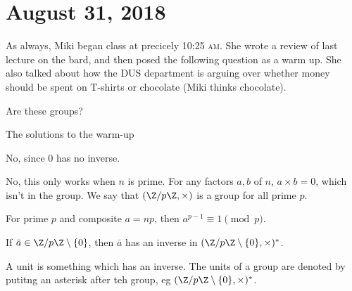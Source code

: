 \section{August 31, 2018}

As always, Miki began class at precicely 10:25 \textsc{am}. She wrote a review of last lecture on the bard, and then posed the following question as a warm up. She also talked about how the DUS department is arguing over whether money should be spent on T-shirts or chocolate (Miki thinks chocolate).

\begin{problem}[Warm Up]
Are these groups?
\end{problem}

\begin{solution}
The solutions to the warm-up
\begin{subproof}
No, since $0$ has no inverse.
\end{subproof}

\begin{subproof}
No, this only works when $n$ is prime. For any factors $a,b$ of $n$, $a \times b = 0$, which isn't in the group. We say that $(\Z/p\Z, \times)$ is a group for all prime $p$.
\end{subproof}
\end{solution}

\begin{theorem}
For prime $p$ and composite $a = np$, then $a^{p-1} \equiv 1 \pmod{p}$. 
\end{theorem}

\begin{lemma}
If $\bar{a} \in \Z/p\Z \setminus \{0\}$, then $\bar{a}$ has an inverse in $(\Z/p\Z \setminus \{0\}, \times)^*$.
\end{lemma}

\begin{definition}[Units]
A unit is something which has an inverse. The units of a group are denoted by putitng an asterisk after teh group, eg $(\Z/p\Z \setminus \{0\}, \times)^*$.
\end{definition}

